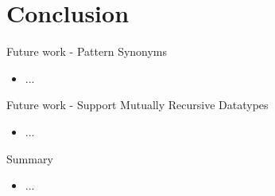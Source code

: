 \section{Conclusion}

\begin{slide}{Future work - Pattern Synonyms}
\begin{itemize}
  \item ...
\end{itemize}
\end{slide}

\begin{slide}{Future work - Support Mutually Recursive Datatypes}
\begin{itemize}
  \item ...
\end{itemize}
\end{slide}

\begin{slide}{Summary}
\begin{itemize}
  \item ...
\end{itemize}
\end{slide}